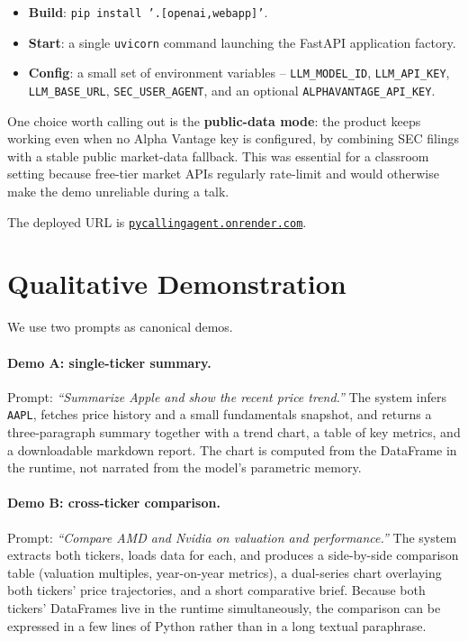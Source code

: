 \documentclass[11pt,a4paper]{article}
\begin{document}
\begin{itemize}[leftmargin=1.3em,itemsep=0.2em]
    \item \textbf{Build}: \texttt{pip install '.[openai,webapp]'}.
    \item \textbf{Start}: a single \texttt{uvicorn} command launching the FastAPI application factory.
    \item \textbf{Config}: a small set of environment variables -- \texttt{LLM\_MODEL\_ID}, \texttt{LLM\_API\_KEY}, \texttt{LLM\_BASE\_URL}, \texttt{SEC\_USER\_AGENT}, and an optional \texttt{ALPHAVANTAGE\_API\_KEY}.
\end{itemize}

One choice worth calling out is the \textbf{public-data mode}: the product keeps working even when no Alpha Vantage key is configured, by combining SEC filings with a stable public market-data fallback. This was essential for a classroom setting because free-tier market APIs regularly rate-limit and would otherwise make the demo unreliable during a talk.

The deployed URL is \href{https://pycallingagent.onrender.com}{\texttt{pycallingagent.onrender.com}}.

\section{Qualitative Demonstration}

We use two prompts as canonical demos.

\paragraph{Demo A: single-ticker summary.}
Prompt: \emph{``Summarize Apple and show the recent price trend.''}
The system infers \texttt{AAPL}, fetches price history and a small fundamentals snapshot, and returns a three-paragraph summary together with a trend chart, a table of key metrics, and a downloadable markdown report. The chart is computed from the DataFrame in the runtime, not narrated from the model's parametric memory.

\paragraph{Demo B: cross-ticker comparison.}
Prompt: \emph{``Compare AMD and Nvidia on valuation and performance.''}
The system extracts both tickers, loads data for each, and produces a side-by-side comparison table (valuation multiples, year-on-year metrics), a dual-series chart overlaying both tickers' price trajectories, and a short comparative brief. Because both tickers' DataFrames live in the runtime simultaneously, the comparison can be expressed in a few lines of Python rather than in a long textual paraphrase.
\end{document}
